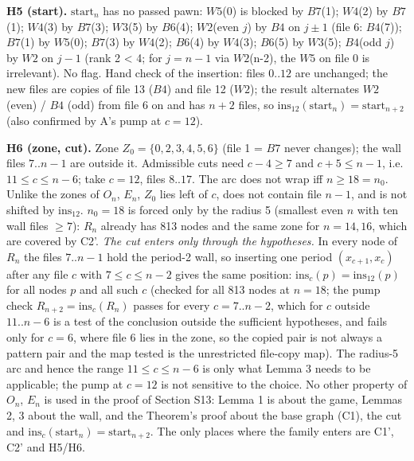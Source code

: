 \textbf{H5 (start).} $\mathrm{start}_n$ has no passed pawn: $W5$(0) is blocked by $B7$(1); $W4$(2) by $B7$(1); $W4$(3) by $B7$(3); $W3$(5) by $B6$(4); $W2$(even $j$) by $B4$ on $j\pm1$ (file 6: $B4$(7)); $B7$(1) by $W5$(0); $B7$(3) by $W4$(2); $B6$(4) by $W4$(3); $B6$(5) by $W3$(5); $B4$(odd $j$) by $W2$ on $j-1$ (rank 2 \textless{} 4; for $j=n-1$ via $W2$(n-2), the $W5$ on file 0 is irrelevant). No flag. Hand check of the insertion: files $0..12$ are unchanged; the new files are copies of file 13 ($B4$) and file 12 ($W2$); the result alternates $W2$ (even) / $B4$ (odd) from file 6 on and has $n+2$ files, so $\mathrm{ins}_{12}(\mathrm{start}_n)=\mathrm{start}_{n+2}$ (also confirmed by A's pump at $c=12$).

\textbf{H6 (zone, cut).} Zone $Z_0=\{0,2,3,4,5,6\}$ (file 1 = $B7$ never changes); the wall files $7..n-1$ are outside it. Admissible cuts need $c-4\ge7$ and $c+5\le n-1$, i.e. $11\le c\le n-6$; take $c=12$, files $8..17$. The arc does not wrap iff $n\ge18=n_0$. Unlike the zones of $O_n$, $E_n$, $Z_0$ lies left of $c$, does not contain file $n-1$, and is not shifted by $\mathrm{ins}_{12}$. $n_0=18$ is forced only by the radius 5 (smallest even $n$ with ten wall files $\ge7$): $R_n$ already has 813 nodes and the same zone for $n=14,16$, which are covered by C2'. \emph{The cut enters only through the hypotheses.} In every node of $R_n$ the files $7..n-1$ hold the period-2 wall, so inserting one period $(x_{c+1},x_c)$ after any file $c$ with $7\le c\le n-2$ gives the same position: $\mathrm{ins}_c(p)=\mathrm{ins}_{12}(p)$ for all nodes $p$ and all such $c$ (checked for all 813 nodes at $n=18$; the pump check $R_{n+2}=\mathrm{ins}_c(R_n)$ passes for every $c=7..n-2$, which for $c$ outside $11..n-6$ is a test of the conclusion outside the sufficient hypotheses, and fails only for $c=6$, where file 6 lies in the zone, so the copied pair is not always a pattern pair and the map tested is the unrestricted file-copy map). The radius-5 arc and hence the range $11\le c\le n-6$ is only what Lemma 3 needs to be applicable; the pump at $c=12$ is not sensitive to the choice. No other property of $O_n$, $E_n$ is used in the proof of Section S13: Lemma 1 is about the game, Lemmas 2, 3 about the wall, and the Theorem's proof about the base graph (C1), the cut and $\mathrm{ins}_c(\mathrm{start}_n)=\mathrm{start}_{n+2}$. The only places where the family enters are C1', C2' and H5/H6.

